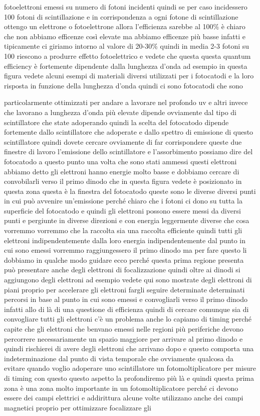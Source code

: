 fotoelettroni emessi su numero di fotoni incidenti quindi se per caso incidessero 100 fotoni di scintillazione e in corrispondenza a ogni fotone di scintillazione ottengo un elettrone o fotoelettrone allora l'efficienza sarebbe al 100\% è chiaro che non abbiamo efficenze così elevate ma abbiamo efficenze più basse infatti e tipicamente ci giriamo intorno al valore di 20-30\% quindi in media 2-3 fotoni su 100 riescono a produrre effetto fotoelettrico e vedete che questa questa quantum efficiency è fortemente dipendente dalla lunghezza d'onda ad esempio in questa figura vedete alcuni esempi di materiali diversi utilizzati per i fotocatodi e la loro risposta in funzione della lunghezza d'onda quindi ci sono fotocatodi che sono 

particolarmente ottimizzati per andare a lavorare nel profondo uv e altri invece che lavorano a lunghezza d'onda più elevate dipende ovviamente dal tipo di scintillatore che state adoperando quindi la scelta del fotocatodo dipende fortemente dallo scintillatore che adoperate e dallo spettro di emissione di questo scintillatore quindi dovete cercare ovviamente di far corrispondere queste due finestre di lavoro l'emissione dello scintillatore e l'assorbimento possiamo dire del fotocatodo a questo punto una volta che sono stati ammessi questi elettroni abbiamo detto gli elettroni hanno energie molto basse e dobbiamo cercare di convobilarli verso il primo dinodo che in questa figura vedete è posizionato in questa zona questa è la finestra del fotocatodo queste sono le diverse diversi punti in cui può avvenire un'emissione perché chiaro che i fotoni ci dono su tutta la superficie del fotocatodo e quindi gli elettroni possono essere messi da diversi punti e pergiunte in diverse direzioni e con energia leggermente diverse che cosa vorremmo vorremmo che la raccolta sia una raccolta efficiente quindi tutti gli elettroni indipendentemente dalla loro energia indipendentemente dal punto in cui sono emessi vorremmo raggiungessero il primo dinodo ma per fare questo li dobbiamo in qualche modo guidare ecco perché questa prima regione presenta può presentare anche degli elettroni di focalizzazione quindi oltre ai dinodi si aggiungono degli elettroni ad esempio vedete qui sono mostrate degli elettroni di piani proprio per accelerare gli elettroni fargli seguire determinate determinati percorsi in base al punto in cui sono emessi e convogliarli verso il primo dinodo infatti allo di là di una questione di efficienza quindi di cercare comunque sia di convogliare tutti gli elettroni c'è un problema anche lo capiamo di timing perché capite che gli elettroni che benvano emessi nelle regioni più periferiche devono percorrere necessariamente un spazio maggiore per arrivare al primo dinodo e quindi rischierei di avere degli elettroni che arrivano dopo e questo comporta una indeterminazione dal punto di vista temporale che ovviamente qualcosa da evitare quando voglio adoperare uno scintillatore un fotomoltiplicatore per misure di timing con questo questo aspetto la profondiremo più là e quindi questa prima zona è una zona molto importante in un fotomoltiplicatore perché ci devono essere dei campi elettrici e addirittura alcune volte utilizzano anche dei campi magnetici proprio per ottimizzare focalizzare gli 